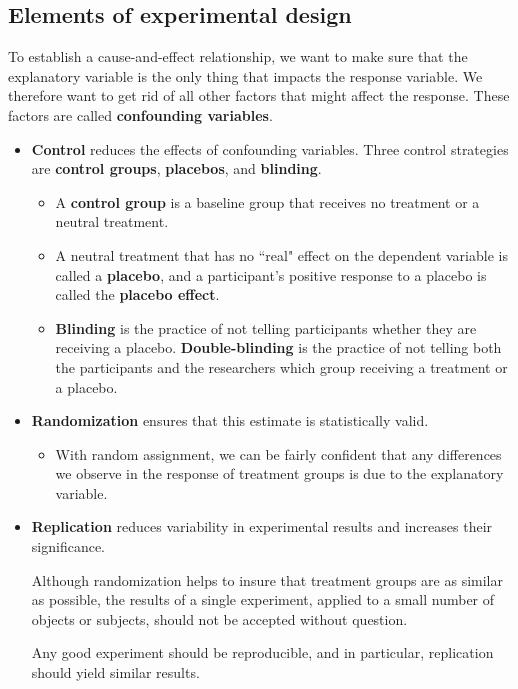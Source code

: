 \hypertarget{elements-of-experimental-design-12}{%
\subsection{Elements of experimental design}\label{elements-of-experimental-design-12}}

To establish a cause-and-effect relationship, we want to make sure
  that the explanatory variable is the only thing that impacts the
  response variable. We therefore want to get rid of all other factors
  that might affect the response. These factors are called \textbf{confounding variables}.

\begin{itemize}
\item \textbf{Control} reduces the effects of confounding variables. Three control strategies are \textbf{control groups}, \textbf{placebos}, and \textbf{blinding}.

  \begin{itemize}
  \item
    A \textbf{control group} is a baseline group that receives no
    treatment or a neutral treatment.
  \item
    A neutral treatment that has no ``real" effect on the dependent
    variable is called a \textbf{placebo}, and a participant's positive response to a placebo is called the \textbf{placebo effect}.
  \item
    \textbf{Blinding} is the practice of not telling participants
    whether they are receiving a placebo. \textbf{Double-blinding} is the practice of not telling both the participants and the
    researchers which group receiving a treatment or a placebo.
  \end{itemize}

\item
  \textbf{Randomization} ensures that this estimate is statistically
  valid.
  \begin{itemize}
  \item
    With random assignment, we can be fairly confident that any
    differences we observe in the response of treatment groups is due to the explanatory variable.
  \end{itemize}

\item
  \textbf{Replication} reduces variability in experimental results and increases their significance.

  Although randomization helps to insure that treatment groups are as similar as possible, the results of a single experiment, applied to a small number of objects or subjects, should not be accepted without question.

  Any good experiment should be reproducible, and in particular, replication should yield similar results.
\end{itemize}

